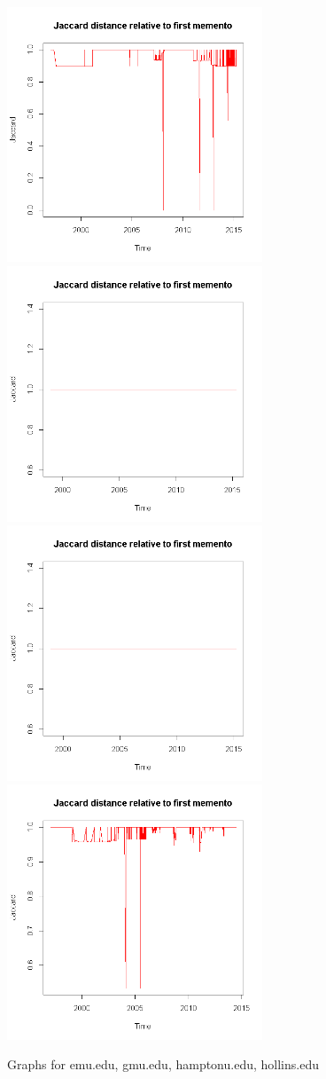 \documentclass[12pt]{article} %
\begin{document}
\begin{figure}
\includegraphics[width=3in]{emu-graph.png}
\includegraphics[width=3in]{gmu-graph.png}
\includegraphics[width=3in]{hampton-graph.png}
\includegraphics[width=3in]{hollins-graph.png}
\caption{Graphs for emu.edu, gmu.edu, hamptonu.edu, hollins.edu}
\end{figure}
\end{document}
